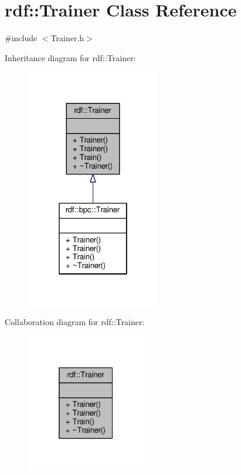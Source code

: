 \hypertarget{classrdf_1_1Trainer}{}\section{rdf\+:\+:Trainer Class Reference}
\label{classrdf_1_1Trainer}


{\ttfamily \#include $<$Trainer.\+h$>$}



Inheritance diagram for rdf\+:\+:Trainer\+:
\nopagebreak
\begin{figure}[H]
\begin{center}
\leavevmode
\includegraphics[width=166pt]{classrdf_1_1Trainer__inherit__graph}
\end{center}
\end{figure}


Collaboration diagram for rdf\+:\+:Trainer\+:
\nopagebreak
\begin{figure}[H]
\begin{center}
\leavevmode
\includegraphics[width=148pt]{classrdf_1_1Trainer__coll__graph}
\end{center}
\end{figure}
